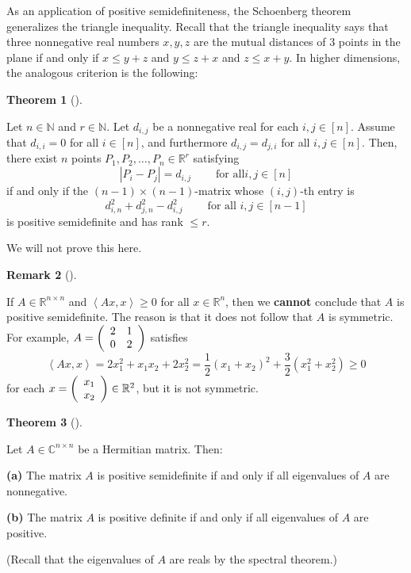 \documentclass[numbers=enddot,12pt,final,onecolumn,notitlepage]{scrartcl}%
\numberwithin{exer}{subsection}
\theoremstyle{definition}
\newtheorem{theo}{Theorem}[subsection]
\newenvironment{theorem}[1][]
{\begin{theo}[#1]\begin{leftbar}}
{\end{leftbar}\end{theo}}
\newtheorem{remk}[theo]{Remark}
\newenvironment{remark}[1][]
{\begin{remk}[#1]\begin{leftbar}}
{\end{leftbar}\end{remk}}
\begin{document}
As an application of positive semidefiniteness, the Schoenberg theorem
generalizes the triangle inequality. Recall that the triangle inequality says
that three nonnegative real numbers $x,y,z$ are the mutual distances of $3$
points in the plane if and only if $x\leq y+z$ and $y\leq z+x$ and $z\leq
x+y$. In higher dimensions, the analogous criterion is the following:

\begin{theorem}
[Schoenberg's theorem]Let $n\in\mathbb{N}$ and $r\in\mathbb{N}$. Let $d_{i,j}$
be a nonnegative real for each $i,j\in\left[  n\right]  $. Assume that
$d_{i,i}=0$ for all $i\in\left[  n\right]  $, and furthermore $d_{i,j}%
=d_{j,i}$ for all $i,j\in\left[  n\right]  $. Then, there exist $n$ points
$P_{1},P_{2},\ldots,P_{n}\in\mathbb{R}^{r}$ satisfying%
\[
\left\vert P_{i}-P_{j}\right\vert =d_{i,j}\ \ \ \ \ \ \ \ \ \ \text{for all
}i,j\in\left[  n\right]
\]
if and only if the $\left(  n-1\right)  \times\left(  n-1\right)  $-matrix
whose $\left(  i,j\right)  $-th entry is
\[
d_{i,n}^{2}+d_{j,n}^{2}-d_{i,j}^{2}\ \ \ \ \ \ \ \ \ \ \text{for all }%
i,j\in\left[  n-1\right]
\]
is positive semidefinite and has rank $\leq r$.
\end{theorem}

We will not prove this here.

\begin{remark}
If $A\in\mathbb{R}^{n\times n}$ and $\left\langle Ax,x\right\rangle \geq0$ for
all $x\in\mathbb{R}^{n}$, then we \textbf{cannot} conclude that $A$ is
positive semidefinite. The reason is that it does not follow that $A$ is
symmetric. For example, $A=\left(
\begin{array}
[c]{cc}%
2 & 1\\
0 & 2
\end{array}
\right)  $ satisfies
\[
\left\langle Ax,x\right\rangle =2x_{1}^{2}+x_{1}x_{2}+2x_{2}^{2}=\dfrac{1}%
{2}\left(  x_{1}+x_{2}\right)  ^{2}+\dfrac{3}{2}\left(  x_{1}^{2}+x_{2}%
^{2}\right)  \geq0
\]
for each $x=\left(
\begin{array}
[c]{c}%
x_{1}\\
x_{2}%
\end{array}
\right)  \in\mathbb{R}^{2}$, but it is not symmetric.
\end{remark}

\begin{theorem}
Let $A\in\mathbb{C}^{n\times n}$ be a Hermitian matrix. Then:

\textbf{(a)} The matrix $A$ is positive semidefinite if and only if all
eigenvalues of $A$ are nonnegative.

\textbf{(b)} The matrix $A$ is positive definite if and only if all
eigenvalues of $A$ are positive.

(Recall that the eigenvalues of $A$ are reals by the spectral theorem.)
\end{theorem}
\end{document}
